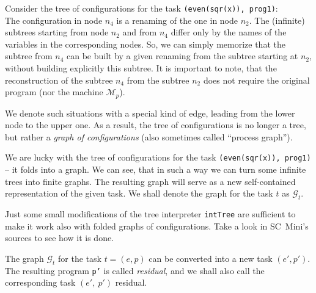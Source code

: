 Consider the tree of configurations for the task \texttt{(even(sqr(x)), prog1)}: \\


The configuration in node $n_4$ is a renaming of the one in node $n_2$.
The (infinite) subtrees starting from node $n_2$ and from $n_4$ differ only by the
names of the variables in the corresponding nodes.
So, we can simply memorize that the subtree from $n_4$ can be built by
a given renaming from the subtree starting at $n_2$, 
without building explicitly this subtree.
It is important to note, that the reconstruction of the subtree
$n_4$ from the subtree $n_2$ does not require the original program (nor the machine $\mathcal{M}_p$).

We denote such situations with a special kind of edge, leading from the lower node to the upper one.
As a result, the tree of configurations is no longer a tree, but rather a \emph{graph of configurations}
(also sometimes called ``process graph'').

We are lucky with the tree of configurations for the task \texttt{(even(sqr(x)), prog1)} -- it folds into a 
graph.
We can see, that in such a way we can turn some infinite trees into finite graphs. 
The resulting graph will serve as a new self-contained representation of the given task.
We shall denote the graph for the task $t$ as $\mathcal{G}_t$.

\begin{exercise}
Just some small modifications of the tree interpreter \texttt{intTree} are sufficient to make
it work also with folded graphs of configurations. Take a look in SC~Mini's sources to see how it is done.
\end{exercise}

The graph $\mathcal{G}_t$ for the task $t = (e, p)$ can be converted into a new task $(e', p')$.
The resulting program \texttt{p'} is called \emph{residual}, and we shall also call
the corresponding task $(e',~p')$ residual.

